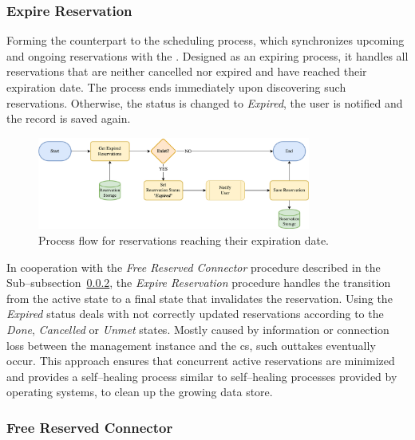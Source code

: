 \subsubsection{Expire Reservation}
\label{ch:Design:sec:Reservation System:ssec:Scheduling Capabilities:sssec:Expire Reservation}

Forming the counterpart to the scheduling process, which synchronizes upcoming and ongoing reservations with the . Designed as an expiring process, it handles all reservations that are neither cancelled nor expired and have reached their expiration date.
The process ends immediately upon discovering such reservations. Otherwise, the status is changed to \textit{Expired}, the user is notified and the record is saved again.

\begin{figure}[h]
    \centering
    \includegraphics[width=0.8\textwidth,keepaspectratio]{resources/images/main/5_design/processes/scheduler/UpdateExpiredReservations.png}
    \caption{Process flow for reservations reaching their expiration date.}
    \label{fig:expire-reservation-flowchart}
\end{figure}

\noindent In cooperation with the \textit{Free Reserved Connector} procedure described in the \\Sub--subsection~\ref{ch:Design:sec:Reservation System:ssec:Scheduling Capabilities:sssec:Free Reserved Connector}, the \textit{Expire Reservation} procedure handles the transition from the active state to a final state that invalidates the reservation.
Using the \textit{Expired} status deals with not correctly updated reservations according to the \textit{Done}, \textit{Cancelled} or \textit{Unmet} states.
Mostly caused by information or connection loss between the management instance and the \acrshort{cs}, such outtakes eventually occur.
This approach ensures that concurrent active reservations are minimized and provides a self--healing process similar to self--healing processes provided by operating systems, to clean up the growing data store.

\subsubsection{Free Reserved Connector}
\label{ch:Design:sec:Reservation System:ssec:Scheduling Capabilities:sssec:Free Reserved Connector}


